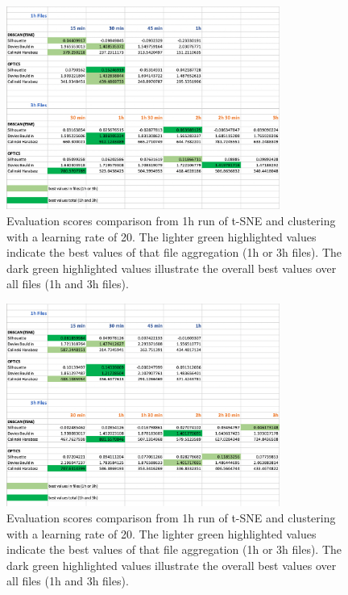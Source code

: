

\begin{figure}[H]
  \centering
  \includegraphics[width=0.8\textwidth]{./images/clusteringResults/clusteringResults1.png}
  \caption{Evaluation scores comparison from 1h run of t-SNE and clustering with a learning rate of 20. The lighter green highlighted values indicate the best values of that file aggregation (1h or 3h files). The dark green highlighted values illustrate the overall best values over all files (1h and 3h files).}
  \label{figure:clusteringResults1}
\end{figure}

\begin{figure}[H]
  \centering
  \includegraphics[width=0.8\textwidth]{./images/clusteringResults/clusteringResults2.png}
  \caption{Evaluation scores comparison from 1h run of t-SNE and clustering with a learning rate of 20. The lighter green highlighted values indicate the best values of that file aggregation (1h or 3h files). The dark green highlighted values illustrate the overall best values over all files (1h and 3h files).}
  \label{figure:clusteringResults2}
\end{figure}


